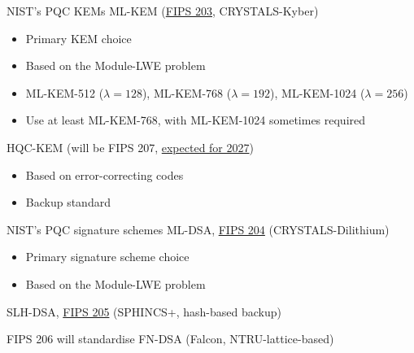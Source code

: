\begin{frame}{NIST's PQC KEMs}
  ML-KEM (\href{https://csrc.nist.gov/pubs/fips/203/final}{FIPS 203}, CRYSTALS-Kyber)
    \begin{itemize}[<+(1)->]
      \item Primary KEM choice
      \item Based on the Module-LWE problem
      \item ML-KEM-512 ($\lambda = 128$), ML-KEM-768 ($\lambda = 192$), ML-KEM-1024 ($\lambda = 256$)
      \item Use at least ML-KEM-768, with ML-KEM-1024 sometimes required
    \end{itemize}

  \vspace*{1em}

  \pause
  HQC-KEM (will be FIPS 207, \href{https://www.nist.gov/news-events/news/2025/03/nist-selects-hqc-fifth-algorithm-post-quantum-encryption}{expected for 2027})
  \begin{itemize}[<+(1)->]
    \item Based on error-correcting codes
    \item Backup standard
  \end{itemize}
\end{frame}

\begin{frame}{NIST's PQC signature schemes}
  ML-DSA, \href{https://csrc.nist.gov/pubs/fips/204/final}{FIPS 204} (CRYSTALS-Dilithium)
  \pause
  \begin{itemize}
    \item Primary signature scheme choice
    \item Based on the Module-LWE problem
  \end{itemize}

  \vspace*{1em}

  \pause
  SLH-DSA, \href{https://csrc.nist.gov/pubs/fips/205/final}{FIPS 205} (SPHINCS+, hash-based backup)
  
  \vspace*{1em}

  \pause
  FIPS 206 will standardise FN-DSA (Falcon, NTRU-lattice-based)
\end{frame}

